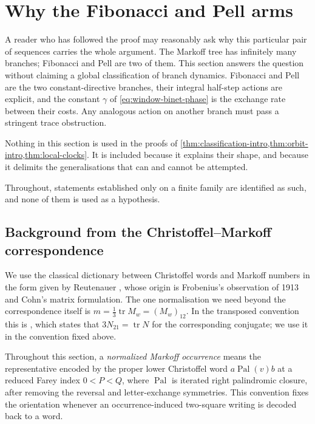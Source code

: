 %
%
\section{Why the Fibonacci and Pell arms}
\label{sec:two-arms}

A reader who has followed the proof may reasonably ask why this particular
pair of sequences carries the whole argument. The Markoff tree has
infinitely many branches; Fibonacci and Pell are two of them. This section
answers the question without claiming a global classification of branch
dynamics. Fibonacci and Pell are the two constant-directive branches, their
integral half-step actions are explicit, and the constant $\gamma$ of
\cref{eq:window-binet-phase} is the exchange rate between their costs. Any
analogous action on another branch must pass a stringent trace obstruction.

Nothing in this section is used in the proofs of
\cref{thm:classification-intro,thm:orbit-intro,thm:local-clocks}. It is
included because it explains their shape, and because it delimits the
generalisations that can and cannot be attempted.

Throughout, statements established only on a finite family are identified
as such, and none of them is used as a hypothesis.

\subsection{Background from the Christoffel--Markoff correspondence}

We use the classical dictionary between Christoffel words and Markoff
numbers in the form given by Reutenauer \cite{Reutenauer2026}, whose origin is
Frobenius's observation of 1913 \cite{Frobenius1913} and Cohn's matrix
formulation. The one normalisation we need beyond the correspondence itself is
$m=\tfrac13\operatorname{tr}M_w=(M_w)_{12}$. In the transposed convention this
is \cite[Lemme~3.2]{Reutenauer2006}, which states that
$3N_{21}=\operatorname{tr}N$ for the corresponding conjugate; we use it in
the convention fixed above.

Throughout this section, a \emph{normalized Markoff occurrence} means the
representative encoded by the proper lower Christoffel word
$a\operatorname{Pal}(v)b$ at a reduced Farey index $0<P<Q$, where
$\operatorname{Pal}$ is iterated right palindromic closure, after removing
the reversal and letter-exchange symmetries. This convention fixes the
orientation whenever an occurrence-induced two-square writing is decoded
back to a word.

